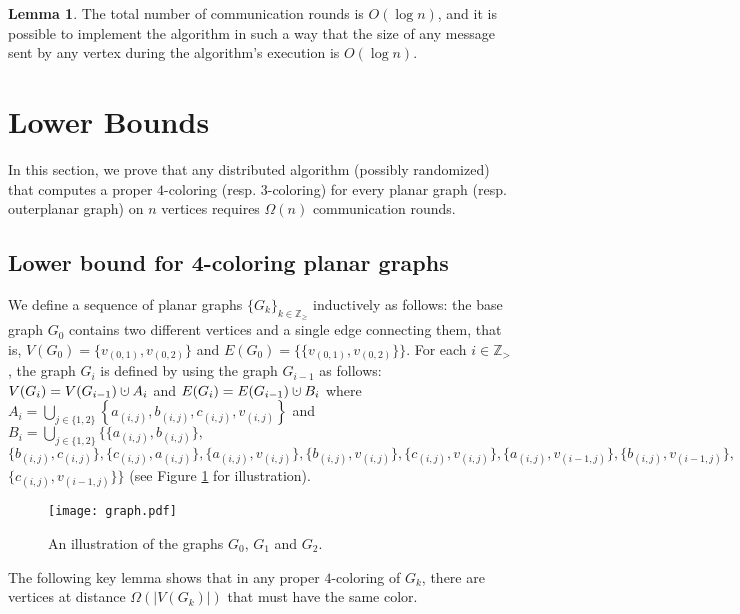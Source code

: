 \documentclass{article}
\theoremstyle{definition}
\newtheorem{lemma}{Lemma}[section]
\def \Z {{\mathbb Z}}
\newcommand{\cupdot}{\mathbin{\mathaccent\cdot\cup}}
\begin{document}
\begin{lemma}The total number of communication rounds is $O(\log{n})$, and it is possible to implement the algorithm in such a way that the size of any message sent by any vertex during the algorithm's execution is $O(\log{n})$. \end{lemma}

\section{Lower Bounds} \label{sec:lowerBounds}
In this section, we prove that any distributed algorithm (possibly randomized) that computes a proper $4$-coloring (resp. $3$-coloring) for every planar graph (resp. outerplanar graph) on $n$ vertices requires $\Omega(n)$ communication rounds.

\subsection{Lower bound for 4-coloring planar graphs}

	We define a sequence of planar graphs $\{G_k\}_{k \in \Z_{\ge}}$ inductively as follows: the base graph $G_0$ contains two different vertices and a single edge connecting them, that is, $V(G_0) = \{v_{(0,1)},v_{(0,2)}\}$ and $E(G_0) = \{\{v_{(0,1)},v_{(0,2)}\}\}$. For each $i \in \Z_{>}$, the graph $G_i$ is defined by using the graph $G_{i-1}$ as follows: $V(G_i) = V(G_{i-1}) \cupdot A_i$ and $E(G_{i}) = E(G_{i-1}) \cupdot B_i$ where $A_{i} = \bigcup_{j \in \{1,2\}}\left\{a_{(i,j)},b_{(i,j)},c_{(i,j)},v_{(i,j)}\right\}$ and  $B_{i} = \bigcup_{j \in \{1,2\}}\{\{a_{(i,j)},b_{(i,j)}\},$\\$\{b_{(i,j)},c_{(i,j)}\},\{c_{(i,j)},a_{(i,j)}\},\{a_{(i,j)},v_{(i,j)}\},\{b_{(i,j)},v_{(i,j)}\},\{c_{(i,j)},v_{(i,j)}\},\{a_{(i,j)},v_{(i-1,j)}\},\{b_{(i,j)},v_{(i-1,j)}\},$\\$\{c_{(i,j)},v_{(i-1,j)}\}\}$ (see Figure \ref{planarLowerBound} for illustration).
	
\begin{figure}[ht!]
	\centering
	\texttt{[image: graph.pdf]}
	\caption{An illustration of the graphs $G_{0}$, $G_{1}$ and $G_{2}$. \label{planarLowerBound}}
\end{figure}

\medskip

The following key lemma shows that in any proper $4$-coloring of $G_k$, there are vertices at distance $\Omega(|V(G_k)|)$ that must have the same color.
\end{document}
